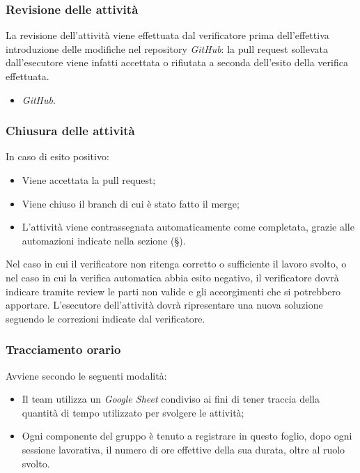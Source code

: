 \documentclass[10pt, a4paper]{article}
\begin{document}
\subsubsection{Revisione delle attività}
La revisione dell'attività viene effettuata dal verificatore prima dell'effettiva introduzione delle modifiche nel repository \textit{GitHub}: la pull request sollevata dall'esecutore viene infatti accettata o rifiutata a seconda dell'esito della verifica effettuata.
\begin{itemize}
    \item \textit{GitHub}.
\end{itemize}
\subsubsection{Chiusura delle attività}
In caso di esito positivo:
\begin{itemize}
    \item Viene accettata la pull request;
    \item Viene chiuso il branch di cui è stato fatto il merge;
    \item L'attività viene contrassegnata automaticamente come completata, grazie alle automazioni indicate nella sezione 
    (\S {}).
\end{itemize}
Nel caso in cui il verificatore non ritenga corretto o sufficiente il lavoro svolto, o nel caso in cui la verifica automatica abbia esito negativo, il verificatore dovrà indicare tramite review le parti non valide e gli accorgimenti che si potrebbero apportare.
L'esecutore dell'attività dovrà ripresentare una nuova soluzione seguendo le correzioni indicate dal verificatore.

\subsubsection{Tracciamento orario}
Avviene secondo le seguenti modalità:
\begin{itemize}
    \item Il team utilizza un \textit{Google Sheet} condiviso ai fini di tener traccia della quantità di tempo utilizzato per svolgere le attività;
    \item Ogni componente del gruppo è tenuto a registrare in questo foglio, dopo ogni sessione lavorativa, il numero di ore effettive della sua durata, oltre al 
    ruolo svolto.
\end{itemize}
 
\end{document}
